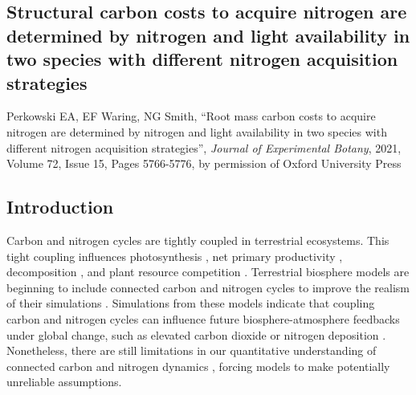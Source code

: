 \begin{singlespace}
    \chapter{\textbf{Structural carbon costs to acquire nitrogen are determined by nitrogen and light availability in two species with different nitrogen acquisition strategies}}
\end{singlespace}

\begin{singlespace}
    \noindent Perkowski EA, EF Waring, NG Smith, ``Root mass carbon costs to acquire nitrogen are determined by nitrogen and light availability in two species with different nitrogen acquisition strategies'', \textit{Journal of Experimental Botany}, 2021, Volume 72, Issue 15, Pages 5766-5776, by permission of Oxford University Press
\end{singlespace}

\section{Introduction} 
\noindent Carbon and nitrogen cycles are tightly coupled in terrestrial ecosystems. This tight coupling influences photosynthesis , net primary productivity , decomposition , and plant resource competition . Terrestrial biosphere models are beginning to include connected carbon and nitrogen cycles to improve the realism of their simulations . Simulations from these models indicate that coupling carbon and nitrogen cycles can influence future biosphere-atmosphere feedbacks under global change, such as elevated carbon dioxide or nitrogen deposition . Nonetheless, there are still limitations in our quantitative understanding of connected carbon and nitrogen dynamics , forcing models to make potentially unreliable assumptions.

